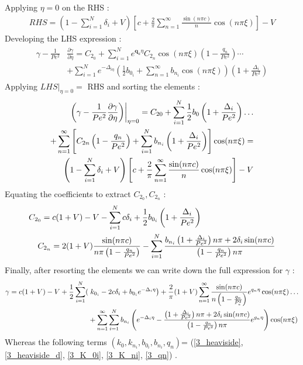 \documentclass[12pt]{article}
\numberwithin{equation}{section}
\begin{document}
\begin{flushleft}
Applying $\eta=0$ on the RHS :
\begin{align} 
R H S=\left(1-\sum_{i=1}^{N} \delta_{i}+V\right)\left[c+\frac{2}{\pi} \sum_{n=1}^{\infty} \frac{\sin (n \pi c)}{n} \cos (n \pi \xi)\right]-V
\end{align} 
Developing the LHS expression :
\begin{align} 
\begin{aligned}
\gamma-\frac{1}{P e^{2}} & \frac{\partial \gamma}{\partial \eta}=C_{2_{0}}+\sum_{i=1}^{N} e^{\mathbf{q}_{a} \eta} C_{2_{n}} \cos (n \pi \xi)\left(1-\frac{q_{n}}{P e^{2}}\right) \cdots \\
&+\sum_{i=1}^{N} e^{-\Delta_{i \eta}}\left(\frac{1}{2} b_{0_{i}}+\sum_{n=1}^{\infty} b_{n_{i}} \cos (n \pi \xi)\right)\left(1+\frac{\Delta_{i}}{P e^{2}}\right)
\end{aligned}
\end{align} 
Applying $LHS \Big|_{\eta=0}=$ RHS and sorting the elements :
\begin{align} \label{3_LHS_RHS}
\left.\left(\gamma-\frac{1}{P e^{2}} \frac{\partial \gamma}{\partial \eta}\right)\right|_{\eta=0}=C_{20}+\sum_{i=1}^{N} \frac{1}{2} b_{0}\left(1+\frac{\Delta_{i}}{P e^{2}}\right) \ldots \\  
+\sum_{n=1}^{\infty}\left[C_{2 n}\left(1-\frac{q_{n}}{P e^{2}}\right)+\sum_{i=1}^{N} b_{n_{i}}\left(1+\frac{\Delta_{i}}{P e^{2}}\right)\right] \cos (n \pi \xi)= \notag \\
\left(1-\sum_{i=1}^{N} \delta_{i}+V\right)\left[c+\frac{2}{\pi} \sum_{n=1}^{\infty} \frac{\sin (n \pi c)}{n} \cos (n \pi \xi)\right]-V \notag
\end{align} 
Equating the coefficients to extract $C_{2_{0}}, C_{2_{n}}$ :
\begin{align} 
C_{2_{0}}=c(1+V)-V-\sum_{i=1}^{N} c \delta_{i}+\frac{1}{2} b_{0_{i}}\left(1+\frac{\Delta_{i}}{P e^{2}}\right) \hspace{32mm} \\
C_{2_{n}}=2(1+V) \frac{\sin (n \pi c)}{n \pi\left(1-\frac{q_{n}}{P e^{2}}\right)}-\sum_{i=1}^{N} \frac{b_{n_{i}}\left(1+\frac{\Delta_{i}}{P e^{2}}\right) n \pi+2 \delta_{i} \sin (n \pi c)}{\left(1-\frac{q_{n}}{P e^{2}}\right) n \pi}
\end{align} 
Finally, after resorting the elements we can write down the full expression for $\gamma$ :
\begin{align} 
\gamma=c(1+V)-V+\frac{1}{2} \sum_{i=1}^{N}(&\left.k_{0_{i}}-2 c \delta_{i}+b_{0_{i}} e^{-\Delta_{i} \eta}\right)+\frac{2}{\pi}(1+V) \sum_{n=1}^{\infty} \frac{\sin (n \pi c)}{n\left(1-\frac{q_{n}}{P_{e}^{2}}\right)} e^{q_{n} \eta} \cos (n \pi \xi) \ldots \\
&+\sum_{n=1}^{\infty} \sum_{i=1}^{N} b_{n_{i}}\left(e^{-\Delta_{i} \eta}-\frac{\left(1+\frac{\Delta_{i}}{P e^{2}}\right) n \pi+2 \delta_{i} \sin (n \pi c)}{\left(1-\frac{q_{n}}{P e^{2}}\right) n \pi} e^{g_{n} \eta}\right) \cos (n \pi \xi) \notag
\end{align} 
Whereas the following terms $\left(k_{0}, k_{n_{i}}, b_{0_{i}}, b_{n_{i}}, q_{n}\right)$= (\ref{3_heaviside}, \ref{3_heaviside_d}, \ref{3_K_0i}, \ref{3_K_ni}, \ref{3_qn}) .


\end{flushleft}
\end{document}
